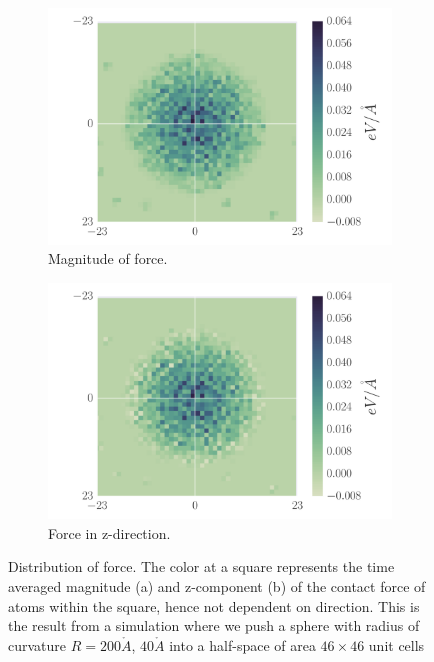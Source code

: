 \documentclass[twoside,english]{uiofysmaster}
\begin{document}
\begin{figure}[H]
	\centering
	\begin{subfigure}{0.49\textwidth}
		\centering
		\includegraphics[width=\linewidth,  trim={15mm 2mm 7mm 2mm}, clip]{figures/forceDistribution/forces/absoluteForceDistribution.pdf}
		\vspace{-7mm}
		\caption{Magnitude of force.}
		\label{fig:absoluteDistribution}
	\end{subfigure}
	\begin{subfigure}{0.49\textwidth}
		\includegraphics[width=\linewidth, trim={13mm 2mm 9mm 2mm}, clip]{figures/forceDistribution/forces/zForceDistribution.pdf}
		\vspace{-7mm}
		\caption{Force in z-direction.}
		\label{fig:zForceDistribution}
	\end{subfigure}
	\vspace*{5mm}
	\caption{Distribution of force. The color at a square represents the time averaged magnitude (a) and z-component (b) of the contact force of atoms within the square, hence not dependent on direction.
		This is the result from a simulation where we push a sphere with radius of curvature $R=200\mathring{A}$, $40\mathring{A}$ into a half-space of area $46\times46$ unit cells}
	\label{fig:forceDistributions}
\end{figure}
\end{document}
